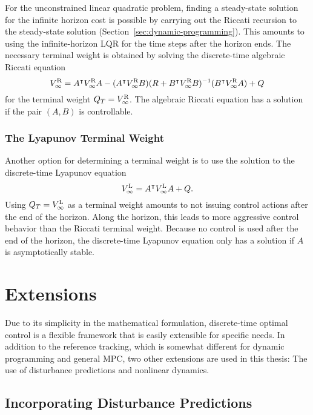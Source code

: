 For the unconstrained linear quadratic problem, finding a steady-state solution
for the infinite horizon cost is possible by carrying out the Riccati recursion
to the steady-state solution (Section~\ref{sec:dynamic-programming}). This
amounts to using the infinite-horizon LQR for the time steps after the horizon
ends. The necessary terminal weight is obtained by solving the discrete-time
algebraic Riccati equation
\begin{equation}
  V^\text{R}_\infty = A^{\intercal} V^\text{R}_\infty A - (A^{\intercal}
V^\text{R}_\infty B)(R + B^{\intercal} V^\text{R}_\infty  B)^{-1}(B^{\intercal}
V^\text{R}_\infty A) + Q
\end{equation}
for the terminal weight $Q_T = V^\text{R}_\infty$. The algebraic
Riccati equation has a solution if the pair $(A,B)$ is
controllable.~\cite[]{Bertsekas:2005:Dynamic}

\subsubsection{The Lyapunov Terminal Weight}

Another option for determining a terminal weight is to use the solution to the
discrete-time Lyapunov equation
\begin{equation}
  V^\text{L}_\infty = A^{\intercal} V^\text{L}_\infty A + Q.
\end{equation}
Using $Q_T = V^\text{L}_\infty$ as a terminal weight amounts to not
issuing control actions after the end of the horizon. Along the horizon, this
leads to more aggressive control behavior than the Riccati terminal weight.
Because no control is used after the end of the horizon, the discrete-time
Lyapunov equation only has a solution if $A$ is asymptotically
stable.~\cite[]{Maciejowski:2002:Predictive}

\section{Extensions}
\label{sec:doc-extensions}

Due to its simplicity in the mathematical formulation, discrete-time optimal
control is a flexible framework that is easily extensible for specific needs.
In addition to the reference tracking, which is somewhat different for dynamic
programming and general MPC, two other extensions are used in this thesis: The
use of disturbance predictions and nonlinear dynamics.

\subsection{Incorporating Disturbance Predictions}

